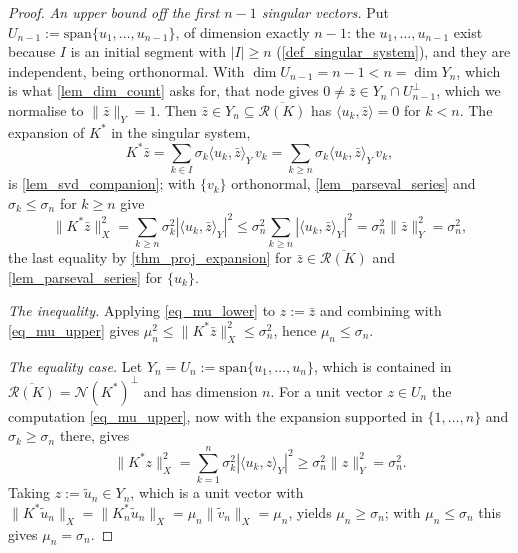\documentclass[a4paper]{report}
\theoremstyle{plain}
\theoremstyle{definition}
\theoremstyle{remark}
\newcommand{\Ran}{\mathcal{R}}
\newcommand{\Ker}{\mathcal{N}}
\begin{document}
\begin{proof}
  \emph{An upper bound off the first $n-1$ singular vectors.}  Put
  $U_{n-1} := \mathrm{span}\{u_1,\dots,u_{n-1}\}$, of dimension exactly $n-1$: the
  $u_1,\dots,u_{n-1}$ exist because $I$ is an initial segment with $|I| \ge n$
  (\cref{def_singular_system}), and they are independent, being orthonormal.  With
  $\dim U_{n-1} = n-1 < n = \dim Y_n$, which is what \cref{lem_dim_count} asks for,
  that node gives
  $0 \ne \bar{z} \in Y_n \cap U_{n-1}^{\perp}$, which we normalise to
  $\|\bar{z}\|_Y = 1$.
  Then $\bar{z} \in Y_n \subseteq \overline{\Ran(K)}$ has
  $\langle u_k,\bar{z}\rangle = 0$ for $k < n$.  The expansion of $K^{*}$ in the singular
  system,
  \[
    K^{*}\bar{z} = \sum_{k \in I}\sigma_k\langle u_k,\bar{z}\rangle_Y\,v_k
      = \sum_{k \ge n}\sigma_k\langle u_k,\bar{z}\rangle_Y\,v_k ,
  \]
  is \cref{lem_svd_companion}; with $\{v_k\}$ orthonormal, \cref{lem_parseval_series} and
  $\sigma_k \le \sigma_n$ for $k \ge n$ give
  \begin{equation}\label{eq_mu_upper}
    \|K^{*}\bar{z}\|_X^{2} = \sum_{k \ge n}\sigma_k^{2}|\langle u_k,\bar{z}\rangle_Y|^{2}
      \le \sigma_n^{2}\sum_{k \ge n}|\langle u_k,\bar{z}\rangle_Y|^{2}
      = \sigma_n^{2}\|\bar{z}\|_Y^{2} = \sigma_n^{2} ,
  \end{equation}
  the last equality by \cref{thm_proj_expansion} for $\bar{z} \in \overline{\Ran(K)}$ and
  \cref{lem_parseval_series} for $\{u_k\}$.

  \emph{The inequality.}  Applying \eqref{eq_mu_lower} to $z := \bar{z}$ and combining
  with \eqref{eq_mu_upper} gives $\mu_n^{2} \le \|K^{*}\bar{z}\|_X^{2} \le \sigma_n^{2}$,
  hence $\mu_n \le \sigma_n$.

  \emph{The equality case.}  Let $Y_n = U_n := \mathrm{span}\{u_1,\dots,u_n\}$, which is
  contained in $\overline{\Ran(K)} = \Ker(K^{*})^{\perp}$ and has dimension $n$.  For a
  unit vector $z \in U_n$ the computation \eqref{eq_mu_upper}, now with the expansion
  supported in $\{1,\dots,n\}$ and $\sigma_k \ge \sigma_n$ there, gives
  \[
    \|K^{*}z\|_X^{2} = \sum_{k=1}^{n}\sigma_k^{2}|\langle u_k,z\rangle_Y|^{2}
      \ge \sigma_n^{2}\|z\|_Y^{2} = \sigma_n^{2} .
  \]
  Taking $z := \tilde{u}_n \in Y_n$, which is a unit vector with
  $\|K^{*}\tilde{u}_n\|_X = \|K_n^{*}\tilde{u}_n\|_X = \mu_n\|\tilde{v}_n\|_X = \mu_n$,
  yields $\mu_n \ge \sigma_n$; with $\mu_n \le \sigma_n$ this gives $\mu_n = \sigma_n$.
\end{proof}
\end{document}
